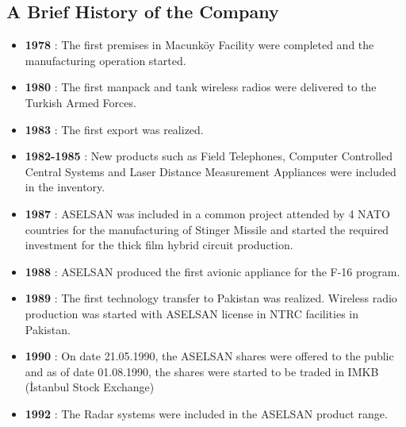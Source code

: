 		

\subsection{A Brief History of the Company}
\begin{itemize}
\item \textbf{ 1978 } : The first premises in Macunköy Facility were completed and the manufacturing operation started.
\item \textbf{ 1980 } : The first manpack and tank wireless radios were delivered to the Turkish Armed Forces.
\item \textbf{ 1983 } : The first export was realized. 
\item \textbf{ 1982-1985 } : New products such as Field Telephones, Computer Controlled Central Systems and Laser Distance Measurement Appliances were included in the inventory. 
\item \textbf{  1987 } : ASELSAN was included in a common project attended by 4 NATO countries for the manufacturing of Stinger Missile and started the required investment for the thick film hybrid circuit production. 
\item \textbf{  1988 } : ASELSAN produced the first avionic appliance for the F-16 program.
\item \textbf{ 1989 } : The first technology transfer to Pakistan was realized. Wireless radio production was started with ASELSAN license in NTRC facilities in Pakistan. 
\item \textbf{  1990 } : On date 21.05.1990, the ASELSAN shares were offered to the public and as of date 01.08.1990, the shares were started to be traded in IMKB (İstanbul Stock Exchange)
\item \textbf{ 1992 } : The Radar systems were included in the ASELSAN product range.

\end{itemize}
